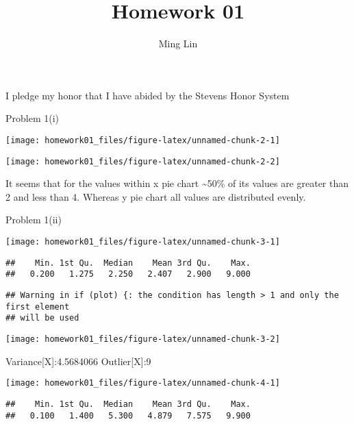 \documentclass[
]{article}
\title{Homework 01}
\author{Ming Lin}
\date{}
\begin{document}
\maketitle

I pledge my honor that I have abided by the Stevens Honor System

Problem 1(i)

\begin{center}\texttt{[image: homework01\_files/figure-latex/unnamed-chunk-2-1]} \end{center}

\begin{center}\texttt{[image: homework01\_files/figure-latex/unnamed-chunk-2-2]} \end{center}

It seems that for the values within x pie chart \textasciitilde50\% of
its values are greater than 2 and less than 4. Whereas y pie chart all
values are distributed evenly.

Problem 1(ii)

\begin{center}\texttt{[image: homework01\_files/figure-latex/unnamed-chunk-3-1]} \end{center}

\begin{verbatim}
##    Min. 1st Qu.  Median    Mean 3rd Qu.    Max. 
##   0.200   1.275   2.250   2.407   2.900   9.000
\end{verbatim}

\begin{verbatim}
## Warning in if (plot) {: the condition has length > 1 and only the first element
## will be used
\end{verbatim}

\begin{center}\texttt{[image: homework01\_files/figure-latex/unnamed-chunk-3-2]} \end{center}

Variance{[}X{]}:4.5684066 Outlier{[}X{]}:9

\begin{center}\texttt{[image: homework01\_files/figure-latex/unnamed-chunk-4-1]} \end{center}

\begin{verbatim}
##    Min. 1st Qu.  Median    Mean 3rd Qu.    Max. 
##   0.100   1.400   5.300   4.879   7.575   9.900
\end{verbatim}
\end{document}
